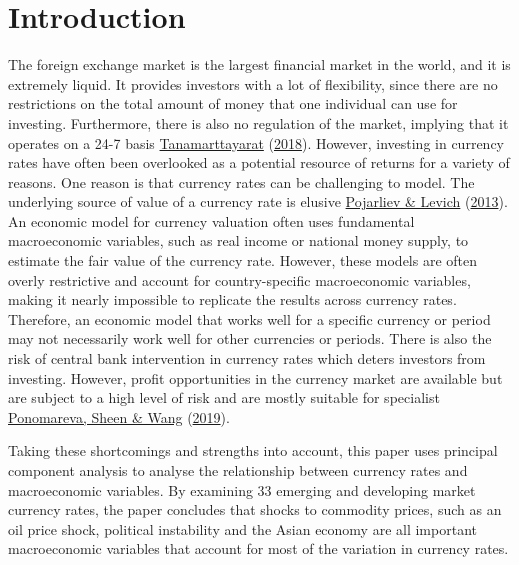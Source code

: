 \documentclass[11pt,preprint, authoryear]{elsarticle}
\numberwithin{equation}{section}
\numberwithin{figure}{section}
\numberwithin{table}{section}
\begin{document}
\headsep 35pt %




\hypertarget{introduction}{%
\section{\texorpdfstring{Introduction
\label{Introduction}}{Introduction }}\label{introduction}}

The foreign exchange market is the largest financial market in the
world, and it is extremely liquid. It provides investors with a lot of
flexibility, since there are no restrictions on the total amount of
money that one individual can use for investing. Furthermore, there is
also no regulation of the market, implying that it operates on a 24-7
basis \protect\hyperlink{ref-tana}{Tanamarttayarat}
(\protect\hyperlink{ref-tana}{2018}). However, investing in currency
rates have often been overlooked as a potential resource of returns for
a variety of reasons. One reason is that currency rates can be
challenging to model. The underlying source of value of a currency rate
is elusive \protect\hyperlink{ref-pojar}{Pojarliev \& Levich}
(\protect\hyperlink{ref-pojar}{2013}). An economic model for currency
valuation often uses fundamental macroeconomic variables, such as real
income or national money supply, to estimate the fair value of the
currency rate. However, these models are often overly restrictive and
account for country-specific macroeconomic variables, making it nearly
impossible to replicate the results across currency rates. Therefore, an
economic model that works well for a specific currency or period may not
necessarily work well for other currencies or periods. There is also the
risk of central bank intervention in currency rates which deters
investors from investing. However, profit opportunities in the currency
market are available but are subject to a high level of risk and are
mostly suitable for specialist \protect\hyperlink{ref-pono}{Ponomareva,
Sheen \& Wang} (\protect\hyperlink{ref-pono}{2019}).

Taking these shortcomings and strengths into account, this paper uses
principal component analysis to analyse the relationship between
currency rates and macroeconomic variables. By examining 33 emerging and
developing market currency rates, the paper concludes that shocks to
commodity prices, such as an oil price shock, political instability and
the Asian economy are all important macroeconomic variables that account
for most of the variation in currency rates.
\end{document}
